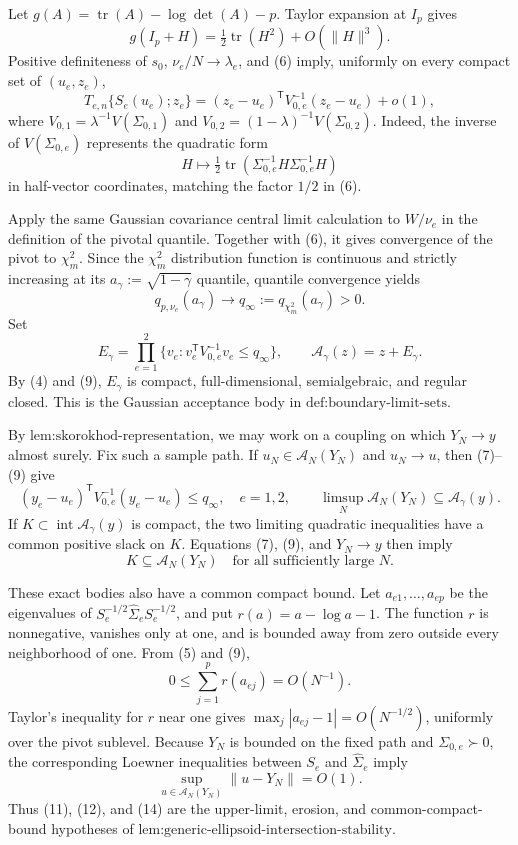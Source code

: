 Let \(g(A)=\operatorname{tr}(A)-\log\det(A)-p\). Taylor expansion at \(I_p\) gives
\[
 g(I_p+H)=\tfrac12\operatorname{tr}(H^2)+O(\|H\|^3).
 \tag{6}
\]
Positive definiteness of \(s_0\), \(\nu_e/N\to\lambda_e\), and (6) imply, uniformly on every compact set of \((u_e,z_e)\),
\[
 T_{e,n}\{S_e(u_e);z_e\}
 =(z_e-u_e)^{\mathsf T}V_{0,e}^{-1}(z_e-u_e)+o(1),
 \tag{7}
\]
where \(V_{0,1}=\lambda^{-1}V(\Sigma_{0,1})\) and \(V_{0,2}=(1-\lambda)^{-1}V(\Sigma_{0,2})\). Indeed, the inverse of \(V(\Sigma_{0,e})\) represents the quadratic form
\[
 H\longmapsto\tfrac12
 \operatorname{tr}(\Sigma_{0,e}^{-1}H\Sigma_{0,e}^{-1}H)
 \tag{8}
\]
in half-vector coordinates, matching the factor \(1/2\) in (6).

Apply the same Gaussian covariance central limit calculation to \(W/\nu_e\) in the definition of the pivotal quantile. Together with (6), it gives convergence of the pivot to \(\chi_m^2\). Since the \(\chi_m^2\) distribution function is continuous and strictly increasing at its \(a_\gamma:=\sqrt{1-\gamma}\) quantile, quantile convergence yields
\[
 q_{p,\nu_e}(a_\gamma)\longrightarrow
 q_\infty:=q_{\chi_m^2}(a_\gamma)>0.
 \tag{9}
\]
Set
\[
 E_\gamma=\prod_{e=1}^2
 \{v_e:v_e^{\mathsf T}V_{0,e}^{-1}v_e\le q_\infty\},
 \qquad
 \mathcal A_\gamma(z)=z+E_\gamma.
 \tag{10}
\]
By (4) and (9), \(E_\gamma\) is compact, full-dimensional, semialgebraic, and regular closed. This is the Gaussian acceptance body in \(\text{def:boundary-limit-sets}\).

By \(\text{lem:skorokhod-representation}\), we may work on a coupling on which \(Y_N\to y\) almost surely. Fix such a sample path. If \(u_N\in\mathcal A_N(Y_N)\) and \(u_N\to u\), then (7)--(9) give
\[
 (y_e-u_e)^{\mathsf T}V_{0,e}^{-1}(y_e-u_e)\le q_\infty,
 \quad e=1,2,
 \qquad
 \limsup_N\mathcal A_N(Y_N)\subseteq\mathcal A_\gamma(y).
 \tag{11}
\]
If \(K\subset\operatorname{int}\mathcal A_\gamma(y)\) is compact, the two limiting quadratic inequalities have a common positive slack on \(K\). Equations (7), (9), and \(Y_N\to y\) then imply
\[
 K\subseteq\mathcal A_N(Y_N)
 \quad\text{for all sufficiently large }N.
 \tag{12}
\]

These exact bodies also have a common compact bound. Let \(a_{e1},\ldots,a_{ep}\) be the eigenvalues of \(S_e^{-1/2}\widehat\Sigma_eS_e^{-1/2}\), and put \(r(a)=a-\log a-1\). The function \(r\) is nonnegative, vanishes only at one, and is bounded away from zero outside every neighborhood of one. From (5) and (9),
\[
 0\le\sum_{j=1}^p r(a_{ej})=O(N^{-1}).
 \tag{13}
\]
Taylor's inequality for \(r\) near one gives \(\max_j|a_{ej}-1|=O(N^{-1/2})\), uniformly over the pivot sublevel. Because \(Y_N\) is bounded on the fixed path and \(\Sigma_{0,e}\succ0\), the corresponding Loewner inequalities between \(S_e\) and \(\widehat\Sigma_e\) imply
\[
 \sup_{u\in\mathcal A_N(Y_N)}\|u-Y_N\|=O(1).
 \tag{14}
\]
Thus (11), (12), and (14) are the upper-limit, erosion, and common-compact-bound hypotheses of \(\text{lem:generic-ellipsoid-intersection-stability}\).


